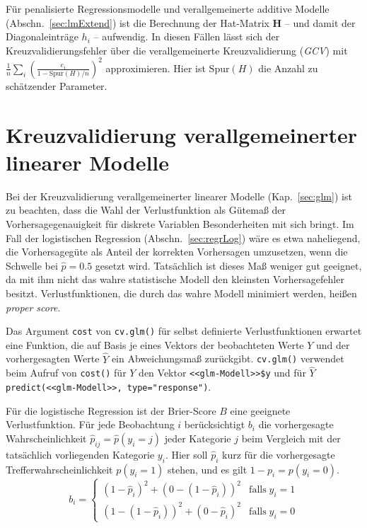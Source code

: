 Für penalisierte Regressionsmodelle und verallgemeinerte additive Modelle (Abschn.\ \ref{sec:lmExtend}) ist die Berechnung der Hat-Matrix $\bm{H}$ -- und damit der Diagonaleinträge $h_{i}$ -- aufwendig. In diesen Fällen lässt sich der Kreuzvalidierungsfehler über die verallgemeinerte Kreuzvalidierung (\emph{GCV}) mit $\frac{1}{n} \sum_{i}{\left(\frac{e_{i}}{1 - \text{Spur}(H)/n}\right)^{2}}$ approximieren. Hier ist $\text{Spur}(H)$ die Anzahl zu schätzender Parameter.

\section{Kreuzvalidierung verallgemeinerter linearer Modelle}
\label{sec:glmCV}

Bei der Kreuzvalidierung verallgemeinerter linearer Modelle (Kap.\ \ref{sec:glm}) ist zu beachten, dass die Wahl der Verlustfunktion als Gütemaß der Vorhersagegenauigkeit für diskrete Variablen Besonderheiten mit sich bringt. Im Fall der logistischen Regression (Abschn.\ \ref{sec:regrLog}) wäre es etwa naheliegend, die Vorhersagegüte als Anteil der korrekten Vorhersagen umzusetzen, wenn die Schwelle bei $\hat{p} = 0.5$ gesetzt wird. Tatsächlich ist dieses Maß weniger gut geeignet, da mit ihm nicht das wahre statistische Modell den kleinsten Vorhersagefehler besitzt. Verlustfunktionen, die durch das wahre Modell minimiert werden, heißen \emph{proper score}.

Das Argument \lstinline!cost! von \lstinline!cv.glm()! für selbst definierte Verlustfunktionen erwartet eine Funktion, die auf Basis je eines Vektors der beobachteten Werte $Y$ und der vorhergesagten Werte $\hat{Y}$ ein Abweichungsmaß zurückgibt. \lstinline!cv.glm()! verwendet beim Aufruf von \lstinline!cost()! für $Y$ den Vektor \lstinline!<<glm-Modell>>$y! und für $\hat{Y}$ \lstinline!predict(<<glm-Modell>>, type="response")!.

Für die logistische Regression ist der Brier-Score $B$ eine geeignete Verlustfunktion. Für jede Beobachtung $i$ berücksichtigt $b_{i}$ die vorhergesagte Wahrscheinlichkeit $\hat{p}_{ij} = \hat{p}(y_{i} = j)$ jeder Kategorie $j$ beim Vergleich mit der tatsächlich vorliegenden Kategorie $y_{i}$. Hier soll $\hat{p}_{i}$ kurz für die vorhergesagte Trefferwahrscheinlichkeit $p(y_{i} = 1)$ stehen, und es gilt $1-p_{i} = p(y_{i} = 0)$.
\begin{equation*}
b_{i} = \left\{\begin{array}{ll}
  (1-\hat{p}_{i})^{2} + (0 - (1-\hat{p}_{i}))^{2} & \text{falls} \; y_{i} = 1\\[1ex]
  (1-(1-\hat{p}_{i}))^{2} + (0 - \hat{p}_{i})^{2} & \text{falls} \; y_{i} = 0
\end{array}\right.
\end{equation*}

